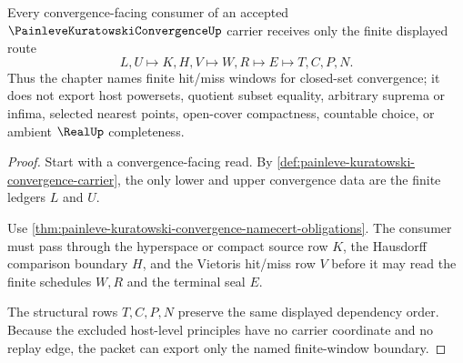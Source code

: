 \begin{theorem}
\label{thm:painleve-kuratowski-convergence-finite-window-boundary}
Every convergence-facing consumer of an accepted $\PainleveKuratowskiConvergenceUp$ carrier receives only the finite displayed route
$$
L,U \longmapsto K,H,V \longmapsto W,R \longmapsto E \longmapsto T,C,P,N .
$$
Thus the chapter names finite hit/miss windows for closed-set convergence; it does not export host powersets, quotient subset equality, arbitrary suprema or infima, selected nearest points, open-cover compactness, countable choice, or ambient $\RealUp$ completeness.
\end{theorem}
\begin{proof}
Start with a convergence-facing read. By \autoref{def:painleve-kuratowski-convergence-carrier}, the only lower and upper convergence data are the finite ledgers $L$ and $U$.

Use \autoref{thm:painleve-kuratowski-convergence-namecert-obligations}. The consumer must pass through the hyperspace or compact source row $K$, the Hausdorff comparison boundary $H$, and the Vietoris hit/miss row $V$ before it may read the finite schedules $W,R$ and the terminal seal $E$.

The structural rows $T,C,P,N$ preserve the same displayed dependency order. Because the excluded host-level principles have no carrier coordinate and no replay edge, the packet can export only the named finite-window boundary.
\end{proof}


\begin{closurestatus}{\PainleveKuratowskiConvergenceUp}
  \theoryclosure{\seedClosure}
  \formalstatus{\unformalizedV}
\end{closurestatus}
